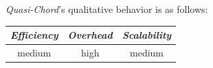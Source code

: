 %
%
%
%
%
%
\emph{Quasi-Chord}'s qualitative behavior is as follows:
\begin{center}
{\footnotesize
\begin{tabular}{ccc}
\emph{Efficiency} & \emph{Overhead} & \emph{Scalability} \\
\hline
medium &
high &
medium
\end{tabular}
}
\end{center}

